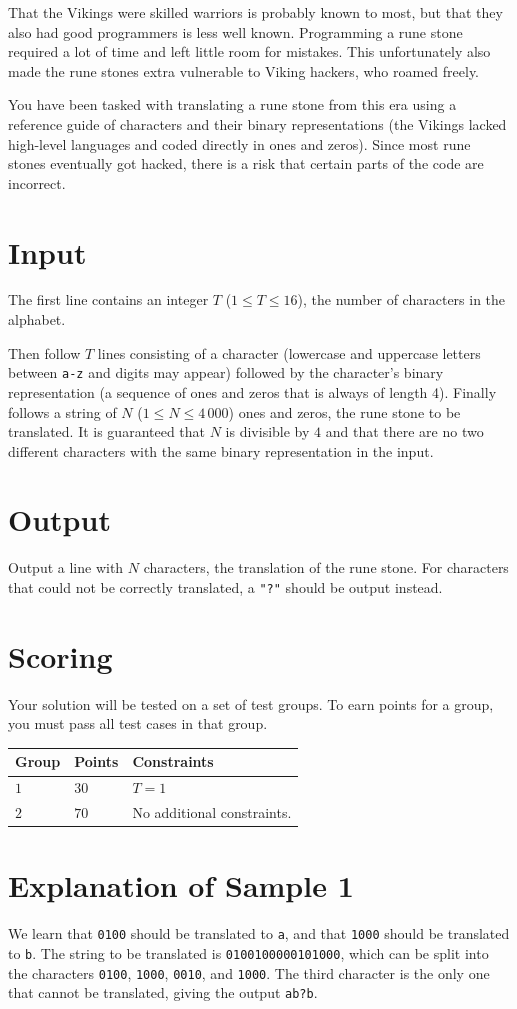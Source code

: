 That the Vikings were skilled warriors is probably known to most, but that they also had good programmers is less well known.
Programming a rune stone required a lot of time and left little room for mistakes.
This unfortunately also made the rune stones extra vulnerable to Viking hackers, who roamed freely.

You have been tasked with translating a rune stone from this era using a reference guide of characters and their binary representations
(the Vikings lacked high-level languages and coded directly in ones and zeros). Since most rune stones eventually got hacked,
there is a risk that certain parts of the code are incorrect.

\section*{Input}
The first line contains an integer $T$ ($1 \le T \le 16$), the number of characters in the alphabet.

Then follow $T$ lines consisting of a character (lowercase and uppercase letters between \texttt{a-z} and digits may appear) followed by the character's binary representation
(a sequence of ones and zeros that is always of length 4).
Finally follows a string of $N$ ($1 \leq N \leq 4\,000$) ones and zeros, the rune stone to be translated. It is guaranteed that $N$ is divisible by $4$ and that there are no two different characters with the same binary representation in the input.

\section*{Output}
Output a line with $N$ characters, the translation of the rune stone. For characters that could not be correctly translated, a \texttt{"?"} should be output instead.

\section*{Scoring}
Your solution will be tested on a set of test groups.
To earn points for a group, you must pass all test cases in that group.

\noindent
\begin{tabular}{| l | l | p{12cm} |}
  \hline
  \textbf{Group} & \textbf{Points} & \textbf{Constraints} \\ \hline
  $1$    & $30$        & $T = 1$ \\ \hline 
  $2$    & $70$        & No additional constraints. \\ \hline 
\end{tabular}

\section*{Explanation of Sample 1}
We learn that \texttt{0100} should be translated to \texttt{a}, and that \texttt{1000} should be translated to \texttt{b}.
The string to be translated is \texttt{0100100000101000}, which can be split into the characters \texttt{0100}, \texttt{1000}, \texttt{0010}, and \texttt{1000}.
The third character is the only one that cannot be translated, giving the output \texttt{ab?b}.
